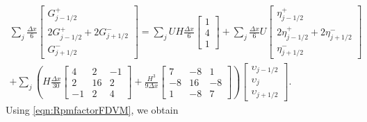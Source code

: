 \begin{multline*}
\sum_j \frac{\Delta x}{6}\begin{bmatrix} G^+_{j -1/2} \\2 G^+_{j -1/2}+2 G^-_{j +1/2} \\ G^-_{j +1/2} \end{bmatrix} = \sum_jUH \frac{\Delta x}{6}\begin{bmatrix} 1 \\4 \\ 1 \end{bmatrix} +  \sum_j \frac{\Delta x}{6}U\begin{bmatrix} \eta^+_{j -1/2} \\2 \eta^+_{j -1/2}+2 \eta^-_{j +1/2} \\ \eta^-_{j +1/2} \end{bmatrix}\\ + \sum_j \left(H\frac{\Delta x}{30}\begin{bmatrix} 4 &2 &-1 \\2 &16 &2  \\-1 &2 &4 \end{bmatrix} + \frac{H^3 }{9\Delta x}\begin{bmatrix} 7 &-8 &1  \\-8 &16 &-8  \\1 &-8 &7  \end{bmatrix} \right) \begin{bmatrix} \upsilon_{j -1/2} \\\upsilon_{j} \\ \upsilon_{j +1/2} \end{bmatrix}.
\end{multline*} 
Using \eqref{eqn:RpmfactorFDVM}, we obtain

